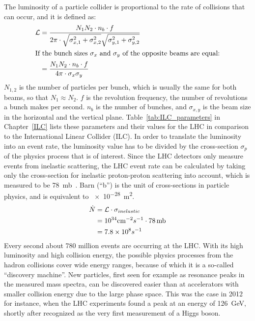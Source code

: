The luminosity of a particle collider is proportional to the rate of collisions that can occur, and it is defined as:
\begin{align}
 \mathcal{L}&=\frac{N_1N_2 \cdot n_b \cdot f}{2\pi \cdot \sqrt{\sigma^2_{x,1}+\sigma^2_{x,2}} \sqrt{\sigma^2_{y,1}+\sigma^2_{y,2}}}\\
 \intertext{If the bunch sizes $\sigma_x$ and $\sigma_y$ of the opposite beams are equal:}
 &=\frac{N_1N_2 \cdot n_b \cdot f}{4\pi \cdot \sigma_x \sigma_y}
 \label{eq:luminosity}
\end{align}
$N_{1,2}$ is the number of particles per bunch, which is usually the same for both beams, so that $N_1\approx N_2$.
$f$ is the revolution frequency, the number of revolutions a bunch makes per second.
$n_{b}$ is the number of bunches, and $\sigma_{x,y}$ is the beam size in the horizontal and the vertical plane.
Table~\ref{tab:ILC_parameters} in Chapter~\ref{ILC} lists these parameters and their values for the LHC in comparison to the International Linear Collider (ILC).
In order to translate the luminosity into an event rate, the luminosity value has to be divided by the cross-section $\sigma_p$ of the physics process that is of interest.
Since the LHC detectors only measure events from inelastic scattering, the LHC event rate can be calculated by taking only the cross-section for inelastic proton-proton scattering into account, which is measured to be \SI{78}{\milli\barn}~\cite{inelXSection}.
Barn (``b'') is the unit of cross-sections in particle physics, and is equivalent to \SI{e-28}{\meter\squared}.
\begin{align}
 \dot{N}&=\mathcal{L}\cdot\sigma_{inelastic}\\
 &=10^{34} \textrm{cm}^{-2}s^{-1} \cdot 78\textrm{\,mb}\\
 &=7.8\times 10^8 s^{-1}
\end{align}
Every second about 780 million events are occurring at the LHC.
With its high luminosity and high collision energy, the possible physics processes from the hadron collisions cover wide energy ranges, because of which it is a so-called ``discovery machine''.
New particles, first seen for example as resonance peaks in the measured mass spectra, can be discovered easier than at accelerators with smaller collision energy due to the large phase space.
This was the case in 2012 for instance, when the LHC experiments found a peak at an energy of \SI{126}{\GeV}, shortly after recognized as the very first measurement of a Higgs boson.~\cite{Higgs}\\
